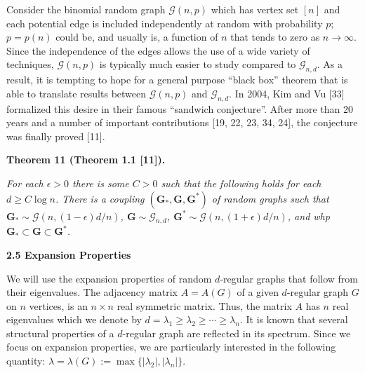 Consider the binomial random graph $\mathcal{G}(n,p)$ which has vertex set $[n]$ and each potential edge is included independently at random with probability $p$; $p=p(n)$ could be, and usually is, a function of $n$ that tends to zero as $n\to\infty$. Since the independence of the edges allows the use of a wide variety of techniques, $\mathcal{G}(n,p)$ is typically much easier to study compared to $\mathcal{G}_{n,d}$. As a result, it is tempting to hope for a general purpose “black box” theorem that is able to translate results between $\mathcal{G}(n,p)$ and $\mathcal{G}_{n,d}$. In 2004, Kim and Vu [33] formalized this desire in their famous “sandwich conjecture”. After more than 20 years and a number of important contributions [19, 22, 23, 34, 24], the conjecture was finally proved [11].\par





\par\medskip\noindent\textbf{
\textbf{Theorem 11}\textbf{ }(Theorem 1.1 [11])\textbf{.}
}\par



\emph{For each $\epsilon>0$ there is some $C>0$ such that the following holds for each $d\geq C\log n$. There is a coupling $(\mathbf{G}_{*},\mathbf{G},\mathbf{G}^{*})$ of random graphs such that $\mathbf{G}_{*}\sim\mathcal{G}(n,(1-\epsilon)d/n)$, $\mathbf{G}\sim\mathcal{G}_{n,d}$, $\mathbf{G}^{*}\sim\mathcal{G}(n,(1+\epsilon)d/n)$, and whp $\mathbf{G}_{*}\subset\mathbf{G}\subset\mathbf{G}^{*}$.}\par







\par\medskip\noindent\textbf{
2.5 Expansion Properties}\par




We will use the expansion properties of random $d$-regular graphs that follow from their eigenvalues. The adjacency matrix $A=A(G)$
of a given $d$-regular graph $G$ on $n$ vertices, is an $n\times n$ real symmetric matrix. Thus, the matrix $A$ has $n$ real eigenvalues which we denote by $d=\lambda_{1}\geq\lambda_{2}\geq\cdots\geq\lambda_{n}$. It is known that several structural properties of a $d$-regular graph are reflected in its spectrum. Since we focus on expansion properties, we are particularly interested in the following quantity: $\lambda=\lambda(G):=\max\{|\lambda_{2}|,|\lambda_{n}|\}$.\par




